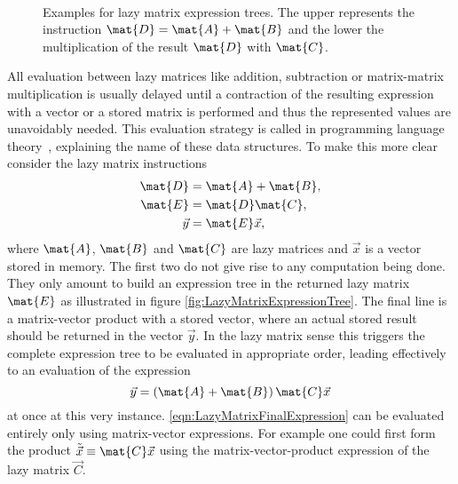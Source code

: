 \begin{figure}
	\centering
	 \\[0.8em]
	\caption[Examples for lazy matrix expression trees]
	{
		Examples for lazy matrix expression trees.
		The upper represents the instruction
		$\mat{D} = \mat{A} + \mat{B}$
		and the lower the multiplication of the result $\mat{D}$
		with $\mat{C}$.
	}
	\label{fig:LazyMatrixExpressionTree}
\end{figure}
All evaluation between lazy matrices
like addition, subtraction or matrix-matrix multiplication
is usually delayed until a contraction of the resulting
expression with a vector or a stored matrix is performed
and thus the represented values are unavoidably needed.
This evaluation strategy is called 
in programming language theory~, explaining the name of these data structures.
To make this more clear consider the lazy matrix instructions
\begin{equation}
	\begin{aligned}
		\label{eqn:LazyMatrixInstructions}
		\mat{D} &= \mat{A} + \mat{B}, \\
		\mat{E} &= \mat{D} \mat{C}, \\
		\vec{y} &= \mat{E} \vec{x},
	\end{aligned}
\end{equation}
where $\mat{A}$, $\mat{B}$ and $\mat{C}$ are lazy matrices
and $\vec{x}$ is a vector stored in memory.
The first two do not give rise to any computation being done.
They only amount to build an expression tree in the returned
lazy matrix $\mat{E}$ as illustrated in figure \vref{fig:LazyMatrixExpressionTree}.
The final line is a matrix-vector product with a stored vector,
where an actual stored result should be returned in the vector $\vec{y}$.
In the lazy matrix sense this triggers the complete expression tree to be
evaluated in appropriate order,
leading effectively to an evaluation of the expression
\begin{equation}
	\vec{y} = \left( \mat{A} + \mat{B} \right) \mat{C} \vec{x}
	\label{eqn:LazyMatrixFinalExpression}
\end{equation}
at once at this very instance.
\eqref{eqn:LazyMatrixFinalExpression} can be evaluated entirely only using
matrix-vector \contraction expressions.
For example one could first form the product $\tilde{\vec{x}} \equiv \mat{C} \vec{x}$
using the matrix-vector-product expression of the lazy matrix $\vec{C}$.
